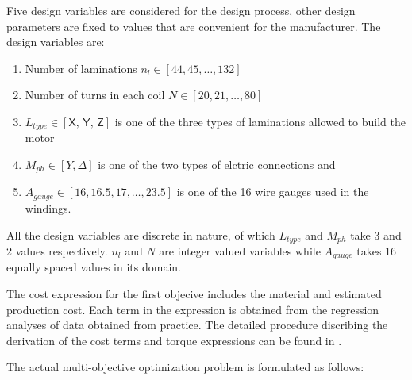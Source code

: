 Five design variables are considered for the design process, other 
design parameters are fixed to values that are convenient for the 
manufacturer. The design variables are:

\begin{enumerate}
\item Number of laminations $n_l \in [44, 45,\dots ,132]$

\item Number of turns in each coil  $N \in [20, 21, \dots, 80]$

\item $L_{type} \in [\textsf{X, Y, Z}]$ is one of the three types of 
laminations allowed to build the motor

\item $M_{ph} \in [Y, \Delta ]$ is one of the two types of elctric 
connections and

\item $A_{gauge} \in [16, 16.5, 17, \dots , 23.5]$ is one of the 16 
wire gauges used in the windings.
\end{enumerate}

All the design variables are discrete in nature, of which $L_{type}$ 
and $M_{ph}$ take 3 and 2 values respectively. $n_l$ and $N$ are 
integer valued variables while $A_{gauge}$ takes 16 equally spaced 
values in its domain.

The cost expression for the first objecive includes the material and
estimated production cost. Each term in the expression is obtained 
from the regression analyses of data obtained from practice. The 
detailed procedure discribing the derivation of the cost terms and 
torque expressions can be found in \cite{chidambaram1999}.

The actual multi-objective optimization problem is formulated as 
follows:



